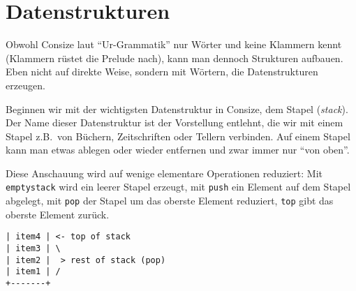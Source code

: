 



\section{Datenstrukturen}
\label{Sec:Datenstrukturen}

Obwohl Consize laut "`Ur-Grammatik"' nur Wörter und keine Klammern kennt (Klammern rüstet die Prelude nach), kann man dennoch Strukturen aufbauen. Eben nicht auf direkte Weise, sondern mit Wörtern, die Datenstrukturen erzeugen.

Beginnen wir mit der wichtigsten Datenstruktur in Consize, dem Stapel (\emph{stack}). Der Name dieser Datenstruktur ist der Vorstellung entlehnt, die wir mit einem Stapel z.B.\ von Büchern, Zeitschriften oder Tellern verbinden. Auf einem Stapel kann man etwas ablegen oder wieder entfernen und zwar immer nur "`von oben"'.

Diese Anschauung wird auf wenige elementare Operationen reduziert: Mit \verb|emptystack| wird ein leerer Stapel erzeugt, mit \verb|push| ein Element auf dem Stapel abgelegt, mit \verb|pop| der Stapel um das oberste Element reduziert, \verb|top| gibt das oberste Element zurück.

\begin{verbatim}
| item4 | <- top of stack
| item3 | \
| item2 |  > rest of stack (pop)
| item1 | /
+-------+
\end{verbatim}

